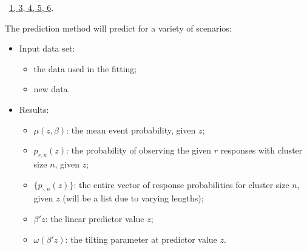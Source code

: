 \documentclass[reqno]{amsart}
\renewcommand{\NWlink}[2]{\hyperlink{#1}{#2}}
\begin{document}
\begin{flushleft}
\begin{list}{}{}
\mbox{}\verb@  if (beta) idx <- c(idx, 1:p)@\\
\mbox{}\verb@  if (f0) idx <- c(idx, (p+1):m)@\\
\mbox{}\verb@  @\\
\mbox{}\verb@  vc <- object$vcov[idx,idx]@\\
\mbox{}\verb@  vc@\\
\mbox{}\verb@}@\\
\mbox{}\verb@@\\
\mbox{}\verb@#' @{\tt @}\verb@rdname coef.spglm@\\
\mbox{}\verb@#'@\\
\mbox{}\verb@#' @{\tt @}\verb@importFrom stats logLik@\\
\mbox{}\verb@#' @{\tt @}\verb@export@\\
\mbox{}\verb@logLik.spglm <- function(object, ...){@\\
\mbox{}\verb@  object$loglik@\\
\mbox{}\verb@}@\\
\mbox{}\verb@                              @\\
\mbox{}\verb@@{\NWsep}
\end{list}
\vspace{-1.5ex}
\footnotesize
\begin{list}{}{\setlength{\itemsep}{-\parsep}\setlength{\itemindent}{-\leftmargin}}
\item \NWtxtFileDefBy\ \NWlink{nuweb1}{1}\NWlink{nuweb3}{, 3}\NWlink{nuweb4}{, 4}\NWlink{nuweb5}{, 5}\NWlink{nuweb6}{, 6}.

\item{}
\end{list}
\vspace{4ex}
\end{flushleft}
The prediction method will predict for a variety of scenarios:
\begin{itemize}
\item Input data set:
  \begin{itemize}
    \item the data used in the fitting;
    \item new data.
  \end{itemize}
\item Results:
  \begin{itemize}
    \item $\mu(z,\beta)$: the mean event probability, given $z$;
    \item $p_{r,n}(z)$: the probability of observing the given $r$ responses with cluster size $n$, given $z$;
    \item $\{p_{\cdot,n}(z)\}$: the entire vector of response probabilities for cluster size $n$, given $z$ (will be a list due to varying lengths);
    \item $\beta'z$: the linear predictor value $z$;
    \item $\omega(\beta'z)$: the tilting parameter at predictor value $z$.
  \end{itemize}
\end{itemize}
\end{document}
